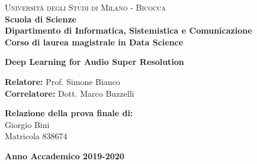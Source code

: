 \documentclass[a4paper,12pt]{book}
\begin{document}
	
	\begin{titlepage}
		
		\noindent
		\begin{minipage}[t]{0.19\textwidth}
		\end{minipage}
		\begin{minipage}[t]{0.81\textwidth}
			{
				{\textsc{Università degli Studi di Milano - Bicocca}} \\
				\textbf{Scuola di Scienze} \\
				\textbf{Dipartimento di Informatica, Sistemistica e Comunicazione} \\
				\textbf{Corso di laurea magistrale in Data Science} \\
				\par
			}
		\end{minipage}
		
		\vspace{40mm}
		
		\begin{center}
			{\LARGE{
					\textbf{Deep Learning for Audio Super Resolution}
					\par
			}}
		\end{center}
		
		\vspace{50mm}
		
		\noindent
		{\large \textbf{Relatore:} Prof. Simone Bianco} \\
		\noindent
		{\large \textbf{Correlatore:} Dott. Marco Buzzelli}
		
		\vspace{15mm}
		
		\begin{flushright}
			{\large \textbf{Relazione della prova finale di:}} \\
			\large{Giorgio Bini} \\
			\large{Matricola 838674} 
		\end{flushright}
		
		\vspace{40mm}
		\begin{center}
			{\large{\bf Anno Accademico 2019-2020}}
		\end{center}
		
		\restoregeometry
		
	\end{titlepage}
	
\end{document}
